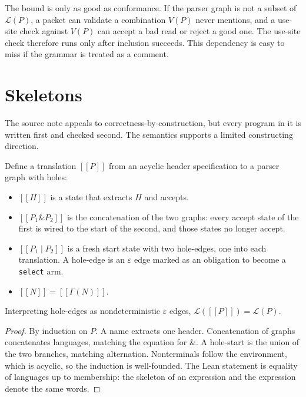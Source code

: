 \documentclass[a4paper,UKenglish,cleveref,autoref]{lipics-v2021}
\newcommand{\sem}[1]{[\![#1]\!]}
\begin{document}
The bound is only as good as conformance.
If the parser graph is not a subset of \(\mathcal{L}(P)\), a packet can validate a combination \(V(P)\) never mentions, and a use-site check against \(V(P)\) can accept a bad read or reject a good one.
The use-site check therefore runs only after inclusion succeeds.
This dependency is easy to miss if the grammar is treated as a comment.

\section{Skeletons}
\label{sec:skeleton}

The source note appeals to correctness-by-construction, but every program in it is written first and checked second.
The semantics supports a limited constructing direction.

Define a translation \(\sem{P}\) from an acyclic header specification to a parser graph with holes:
\begin{itemize}
\item \(\sem{H}\) is a state that extracts \(H\) and accepts.
\item \(\sem{P_1 \mathbin{\&} P_2}\) is the concatenation of the two graphs: every accept state of the first is wired to the start of the second, and those states no longer accept.
\item \(\sem{P_1 \mathrel{\vert} P_2}\) is a fresh start state with two hole-edges, one into each translation.
  A hole-edge is an \(\varepsilon\) edge marked as an obligation to become a \texttt{select} arm.
\item \(\sem{N} = \sem{\Gamma(N)}\).
\end{itemize}

\begin{theorem}
\label{thm:skel}
Interpreting hole-edges as nondeterministic \(\varepsilon\) edges, \(\mathcal{L}(\sem{P}) = \mathcal{L}(P)\).
\end{theorem}

\begin{proof}
By induction on \(P\).
A name extracts one header.
Concatenation of graphs concatenates languages, matching the equation for \(\&\).
A hole-start is the union of the two branches, matching alternation.
Nonterminals follow the environment, which is acyclic, so the induction is well-founded.
The Lean statement is equality of languages up to membership: the skeleton of an expression and the expression denote the same words.
\end{proof}
\end{document}
